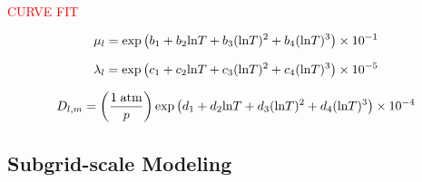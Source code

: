 \textcolor{red}{CURVE FIT}

\begin{equation}
	\mu_{l} = \text{exp} \left( b_1 + b_2 \text{ln}T + b_3 (\text{ln}T)^2 + b_4 (\text{ln}T)^3  \right) \times 10^{-1}
\end{equation}

\begin{equation}
	\lambda_{l} = \text{exp} \left( c_1 + c_2 \text{ln}T + c_3 (\text{ln}T)^2 + c_4 (\text{ln}T)^3  \right) \times 10^{-5}
\end{equation}

\begin{equation}
	D_{l, m} = \left(\frac{1 \; \text{atm}}{p}\right) \text{exp} \left( d_1 + d_2 \text{ln}T + d_3 (\text{ln}T)^2 + d_4 (\text{ln}T)^3 \right) \times 10^{-4}
\end{equation}

\subsection{Subgrid-scale Modeling}